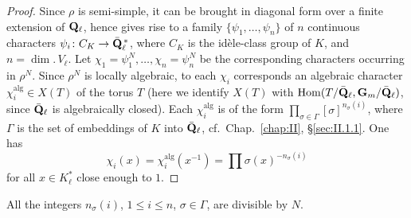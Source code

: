 \begin{proof}
Since $\rho$ is semi-simple, it can be brought in diagonal form over a
finite extension of $\mathbf{Q}_\ell$, hence gives rise to a family
$\{\psi_1,\ldots,\psi_n\}$ of $n$ continuous characters
$\psi_i\colon C_K\to\bar{\mathbf{Q}}_\ell^{\,*}$, where $C_K$ is the
idèle-class group of $K$, and $n=\dim.\,V_\ell$.  Let
$\chi_1=\psi_1^N,\ldots,\chi_n=\psi_n^N$ be the corresponding
characters occurring in $\rho^N$.  Since $\rho^N$ is locally
algebraic, to each $\chi_i$ corresponds an algebraic character
$\chi_i^{\mathrm{alg}}\in X(T)$ of the torus $T$ (here we identify
$X(T)$ with $\mathrm{Hom}(T/\bar{\mathbf{Q}}_\ell,\mathbf{G}_m/\bar{\mathbf{Q}}_\ell)$, since
$\bar{\mathbf{Q}}_\ell$ is algebraically closed).  Each $\chi_i^{\mathrm{alg}}$
is of the form $\prod\limits_{\sigma\in\Gamma}
[\sigma]^{n_\sigma(i)}$, where $\Gamma$ is the set of embeddings of
$K$ into $\bar{\mathbf{Q}}_\ell$, cf.~Chap.~\ref{chap:II},
\S\ref{sec:II.1.1}.  One has
\[
\chi_i(x)=\chi_i^{\mathrm{alg}}(x^{-1})
=\prod\sigma(x)^{-n_\sigma(i)}
\]
for all $x\in K_\ell^*$ close enough to $1$.
\end{proof}

\begin{lemma}
All the integers $n_\sigma(i)$, $1\leq i\leq n$, $\sigma\in\Gamma$,
are divisible by $N$.
\end{lemma}

